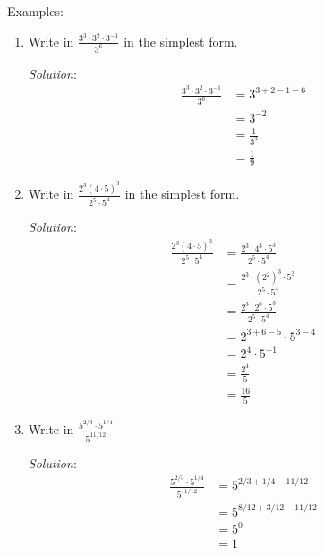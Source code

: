 \documentclass[16pt]{article}
\theoremstyle{remark}
\begin{document}
Examples:
\begin{enumerate}
\item  Write in $\displaystyle{\frac{3^3 \cdot 3^2 \cdot 3^{-1}}{3^6}}$ in the simplest form.
\begin{mdframed}[style=TheoremFrame]
\textit{Solution}:
\begin{align*}
\frac{3^3 \cdot 3^2 \cdot 3^{-1}}{3^6} &= 3^{3+2-1-6}\\
&= 3^{-2}\\
&= \frac{1}{3^2}\\
&= \frac{1}{9}
\end{align*}
\end{mdframed}
\newpage
\item Write in $\displaystyle{\frac{2^3 (4\cdot 5)^3}{2^5 \cdot5^4}}$ in the simplest form.
\begin{mdframed}[style=TheoremFrame]
\textit{Solution}:
\begin{align*}
\frac{2^3 (4\cdot 5)^3}{2^5 \cdot 5^4} &= \frac{2^3 \cdot 4^3 \cdot 5^3}{2^5 \cdot 5^4}\\
&= \frac{2^3 \cdot (2^2)^3 \cdot 5^3}{2^5 \cdot 5^4}\\
&= \frac{2^3 \cdot 2^6 \cdot 5^3}{2^5 \cdot 5^4}\\
&= 2^{3+6-5} \cdot 5^{3-4}\\
&= 2^4 \cdot 5^{-1}\\
&= \frac{2^4}{5}\\
&= \frac{16}{5}
\end{align*}
\end{mdframed}
\item Write in $\displaystyle{\frac{5^{2/3} \cdot 5^{1/4}}{5^{11/12}}}$
\begin{mdframed}[style=TheoremFrame]
\textit{Solution}:
\begin{align*}
\frac{5^{2/3} \cdot 5^{1/4}}{5^{11/12}} &= 5^{2/3 + 1/4 - 11/12}\\
&= 5^{8/12 + 3/12 - 11/12}\\
&= 5^0\\
&=1
\end{align*}
\end{mdframed}
\end{enumerate}
\end{document}
